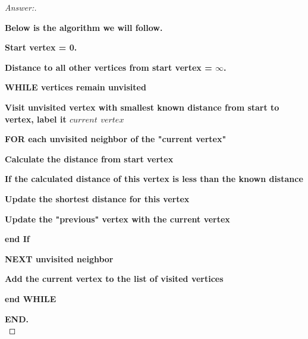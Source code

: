 \documentclass[11pt]{article}
\theoremstyle{definition}
\theoremstyle{definition}
\theoremstyle{definition}
\begin{document}
\begin{proof}[Answer:] \
\item \textbf{Below is the algorithm we will follow.}\\
\item \textbf{Start vertex = 0.}
\item \textbf{Distance to all other vertices from start vertex = $\infty$.} \\
\item \hspace{2mm} \textbf{WHILE vertices remain unvisited}
\item \hspace{6mm} \textbf{Visit unvisited vertex with smallest known distance from start to vertex, label it $current$ $vertex$}
\item \hspace{6mm} \textbf{FOR each unvisited neighbor of the "current vertex"}
\item \hspace{8mm} \textbf{Calculate the distance from start vertex}
\item \hspace{8mm} \textbf{If the calculated distance of this vertex is less than the known distance}
\item \hspace{10mm} \textbf{Update the shortest distance for this vertex}
\item \hspace{10mm} \textbf{Update the "previous" vertex with the current vertex}
\item \hspace{8mm} \textbf{end If}
\item \hspace{6mm} \textbf{NEXT unvisited neighbor}
\item \hspace{6mm} \textbf{Add the current vertex to the list of visited vertices}
\item \hspace{2mm} \textbf{end WHILE}
\item \textbf{END.} \\


\end{proof}
\end{document}
